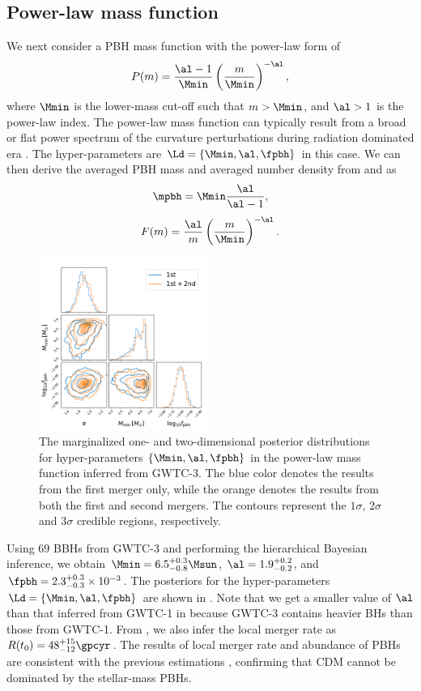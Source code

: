 \documentclass[
reprint,           %
superscriptaddress,%
amsmath,           %
amssymb,           %
aps,               %
prd,               %
notitlepage,       %
longbibliography,  %
floatfix,          %
nofootinbib,
]{revtex4-1}
\def\({\left(}
\def\){\right)}
\def\e{\begin{equation}}
\def\q{\end{equation}}
\begin{document}
\subsection{Power-law mass function}


We next consider a PBH mass function with the power-law form \cite{Carr:1975qj} of
\e\label{power} 
P(m) = \frac{\al-1}{\Mmin} \(\frac{m}{\Mmin}\)^{-\al},
\q
where $\Mmin$ is the lower-mass cut-off such that $m>\Mmin$, and $\al>1$ is the power-law index. 
The power-law mass function can typically result from a broad or flat power spectrum of the curvature perturbations \cite{DeLuca:2020ioi} during radiation dominated era \cite{Carr:2016drx,Carr:2017jsz}.
The hyper-parameters are $\Ld = \{\Mmin, \al, \fpbh\}$ in this case. 
We can then derive the averaged PBH mass and averaged number density from  and  as
\e
\mpbh = \Mmin \frac{\al}{\al-1},
\q
\e 
F(m) = \frac{\al}{m} \(\frac{m}{\Mmin}\)^{-\al}.
\q

\begin{figure}[tbp!]
	\centering
	\includegraphics[width=0.5\textwidth]{post-power.pdf}
	\caption{\label{posterior-power}The marginalized one- and two-dimensional posterior distributions for hyper-parameters $\{\Mmin, \al, \fpbh\}$ in the power-law mass function inferred from GWTC-3. The blue color denotes the results from the first merger only, while the orange denotes the results from both the first and second mergers. The contours represent the $1\sigma$, $2\sigma$ and $3\sigma$ credible regions, respectively.}
\end{figure}

Using $69$ BBHs from GWTC-3 and performing the hierarchical Bayesian inference, we obtain $\Mmin = 6.5^{+0.3}_{-0.8} \Msun$, $\al = 1.9^{+0.2}_{-0.2}$, and $\fpbh = 2.3^{+0.3}_{-0.3} \times 10^{-3}$. The posteriors for the hyper-parameters $\Ld = \{\Mmin, \al, \fpbh\}$ are shown in . Note that we get a smaller value of $\al$ than that inferred from GWTC-1 in \cite{Wu:2020drm} because GWTC-3 contains heavier BHs than those from GWTC-1. From , we also infer the local merger rate as $R(t_0) = 48^{+15}_{-12} \gpcyr$. The results of local merger rate and abundance of PBHs are consistent with the previous estimations \cite{Chen:2018czv,Chen:2018rzo,Chen:2019irf,Wu:2020drm,Chen:2021nxo,Chen:2022fda}, confirming that CDM cannot be dominated by the stellar-mass PBHs.
\end{document}

